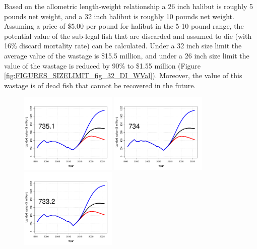 Based on the allometric length-weight relationship a 26 inch halibut is roughly 5 pounds net weight, and a 32 inch halibut is roughly 10 pounds net weight. Assuming a price of \$5.00 per pound for halibut in the 5-10 pound range, the potential value of the sub-legal fish that are discarded and assumed to die (with 16\% discard mortality rate) can be calculated.  Under a 32 inch size limit the average value of the wastage is \$15.5 million, and under a 26 inch size limit the value of the wastage is reduced by 90\% to  \$1.55 million (Figure \ref{fig:FIGURES_SIZELIMIT_fig_32_DI_WVal}).  Moreover, the value of this wastage is of dead fish that cannot be recovered in the future.


\begin{figure}[htbp]
	\centering
		\includegraphics[height=1.5in]{../FIGURES/SIZELIMIT/fig_32_DI_LVal.pdf}
		\includegraphics[height=1.5in]{../FIGURES/SIZELIMIT/fig_29_DI_LVal.pdf}
		\includegraphics[height=1.5in]{../FIGURES/SIZELIMIT/fig_26_DI_LVal.pdf}
		                                                              

\end{figure}
